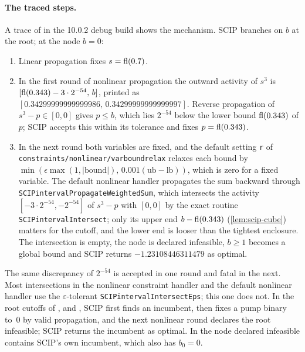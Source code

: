 \paragraph{The traced steps.}
A trace of  in the 10.0.2 debug build shows the mechanism.
SCIP branches on $b$ at the root; at the node $b=0$:
\begin{enumerate}
\item Linear propagation fixes $s=\operatorname{fl}(0.7)$.
\item In the first round of nonlinear propagation the outward activity of $s^3$ is $[\operatorname{fl}(0.343)-3\cdot2^{-54},\,b]$, printed as $[0.34299999999999986,\,0.34299999999999997]$.
Reverse propagation of $s^3-p\in[0,0]$ gives $p\le b$, which lies $2^{-54}$ below the lower bound $\operatorname{fl}(0.343)$ of $p$; SCIP accepts this within its tolerance and fixes $p=\operatorname{fl}(0.343)$.
\item In the next round both variables are fixed, and the default setting \texttt{r} of \texttt{constraints/\allowbreak nonlinear/\allowbreak varboundrelax} relaxes each bound by $\min(\epsilon\max(1,|\text{bound}|),\,0.001(\text{ub}-\text{lb}))$, which is zero for a fixed variable.
The default nonlinear handler propagates the sum backward through \texttt{SCIPinterval\allowbreak PropagateWeightedSum}, which intersects the activity $[-3\cdot2^{-54},-2^{-54}]$ of $s^3-p$ with $[0,0]$ by the exact routine \texttt{SCIPintervalIntersect}; only its upper end $b-\operatorname{fl}(0.343)$ (\cref{lem:scip-cube}) matters for the cutoff, and the lower end is looser than the tightest enclosure.
The intersection is empty, the node is declared infeasible, $b\ge1$ becomes a global bound and SCIP returns $-1.23108446311479$ as optimal.
\end{enumerate}
The same discrepancy of $2^{-54}$ is accepted in one round and fatal in the next.
Most intersections in the nonlinear constraint handler and the default nonlinear handler use the $\varepsilon$-tolerant \texttt{SCIPintervalIntersectEps}; this one does not.
In the root cutoffs of ,  and , SCIP first finds an incumbent, then fixes a pump binary to~0 by valid propagation, and the next nonlinear round declares the root infeasible; SCIP returns the incumbent as optimal.
In  the node declared infeasible contains SCIP's own incumbent, which also has $b_0=0$.

